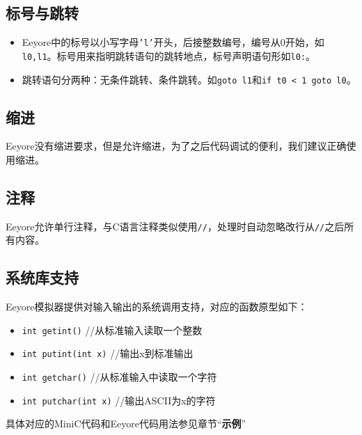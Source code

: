 \documentclass{ctexart}
\begin{document}
\subsection{标号与跳转}
\begin{itemize}
\item 
Eeyore中的标号以小写字母\texttt{'l'}开头，后接整数编号，编号从0开始，如\texttt{l0,l1}。标号用来指明跳转语句的跳转地点，标号声明语句形如\texttt{l0:}。

\item
跳转语句分两种：无条件跳转、条件跳转。如\texttt{goto l1}和\texttt{if t0 < 1 goto l0}。

\end{itemize}
\subsection{缩进}
Eeyore没有缩进要求，但是允许缩进，为了之后代码调试的便利，我们建议正确使用缩进。
\subsection{注释}
Eeyore允许单行注释，与C语言注释类似使用\texttt{//}，处理时自动忽略改行从\texttt{//}之后所有内容。
\subsection{系统库支持}
Eeyore模拟器提供对输入输出的系统调用支持，对应的函数原型如下：
\begin{itemize}
	\item \texttt{int getint()} //从标准输入读取一个整数
	\item \texttt{int putint(int x)} //输出x到标准输出
	\item \texttt{int getchar()} //从标准输入中读取一个字符
	\item \texttt{int putchar(int x)} //输出ASCII为x的字符
\end{itemize}
具体对应的MiniC代码和Eeyore代码用法参见章节“\textbf{示例}”
\newpage
\end{document}
